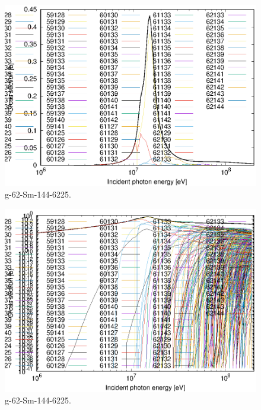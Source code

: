 \begin{figure}
 \includegraphics[width=\linewidth]{eps/g_62-Sm-144_6225.eps}
  \caption{g-62-Sm-144-6225.}
\end{figure}
\begin{figure}
 \includegraphics[width=\linewidth]{eps-log/g_62-Sm-144_6225.eps}
 \caption{g-62-Sm-144-6225.}
\end{figure}
\newpage \clearpage

